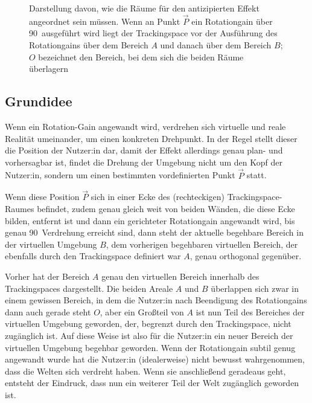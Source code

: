\begin{figure}[H]
    \caption{Darstellung davon, wie die Räume für den antizipierten Effekt angeordnet sein müssen. Wenn an Punkt $\vec{P}$ ein Rotationgain über 90\textdegree\ ausgeführt wird liegt der Trackingspace vor der Ausführung des Rotationgains über dem Bereich $A$ und danach über dem Bereich $B$; $O$ bezeichnet den Bereich, bei dem sich die beiden Räume überlagern}\label{figure:two_rooms}
\end{figure}

\subsection{Grundidee}
\label{subsec:roomplaceidea}
Wenn ein Rotation-Gain angewandt wird, verdrehen sich virtuelle und reale Realität umeinander, um einen konkreten Drehpunkt. In der Regel stellt dieser die Position der Nutzer:in dar, damit der Effekt allerdings genau plan- und vorhersagbar ist, findet die Drehung der Umgebung nicht um den Kopf der Nutzer:in, sondern um einen bestimmten vordefinierten Punkt $\vec{P}$ statt.

Wenn diese Position $\vec{P}$ sich in einer Ecke des (rechteckigen) Trackingspace-Raumes befindet, zudem genau gleich weit von beiden Wänden, die diese Ecke bilden, entfernt ist und dann ein gerichteter Rotationgain angewandt wird,
bis genau 90\textdegree\ Verdrehung erreicht sind, dann steht der aktuelle begehbare Bereich in der virtuellen Umgebung $B$, dem vorherigen begehbaren virtuellen Bereich, der ebenfalls durch den Trackingspace definiert war $A$, genau orthogonal gegenüber.

Vorher hat der Bereich $A$ genau den virtuellen Bereich innerhalb des Trackingspaces dargestellt. Die beiden Areale $A$ und $B$ überlappen sich zwar in einem gewissen Bereich, in dem die Nutzer:in nach Beendigung des Rotationgains dann auch gerade steht $O$, aber ein Großteil von $A$ ist nun Teil des Bereiches der virtuellen Umgebung geworden, der, begrenzt durch den Trackingspace, nicht zugänglich ist. Auf diese Weise ist also für die Nutzer:in ein neuer Bereich der virtuellen Umgebung begehbar geworden.
Wenn der Rotationgain subtil genug angewandt wurde hat die Nutzer:in (idealerweise) nicht bewusst wahrgenommen, dass die Welten sich verdreht haben. Wenn sie anschließend geradeaus geht, entsteht der Eindruck, dass nun ein weiterer Teil der Welt zugänglich geworden ist.

